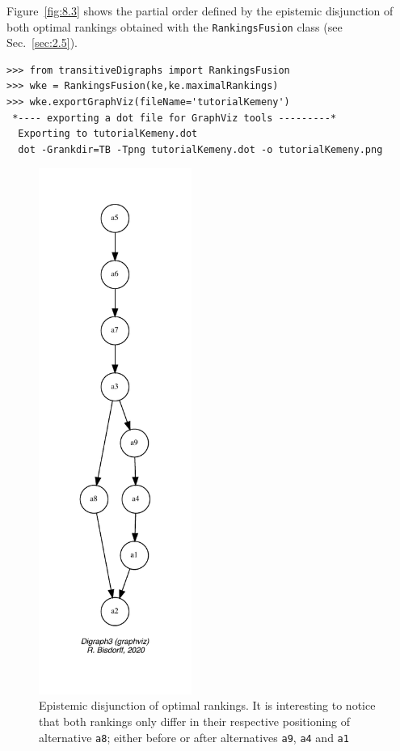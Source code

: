 Figure~\vref{fig:8.3} shows the partial order defined by the epistemic disjunction of both optimal \Kemeny rankings obtained with the \texttt{RankingsFu\-sion} class (see Sec.~\ref{sec:2.5}).
\begin{lstlisting}[caption={Computing the epistemic disjunction of all optimal \Kemeny rankings},label=list:8.10]   
>>> from transitiveDigraphs import RankingsFusion
>>> wke = RankingsFusion(ke,ke.maximalRankings)
>>> wke.exportGraphViz(fileName='tutorialKemeny')
 *---- exporting a dot file for GraphViz tools ---------*
  Exporting to tutorialKemeny.dot
  dot -Grankdir=TB -Tpng tutorialKemeny.dot -o tutorialKemeny.png
\end{lstlisting}
\begin{figure}[ht]
\sidecaption[t]
\includegraphics[width=5cm]{Figures/8-3-tutorialKemeny.pdf}
\caption{Epistemic disjunction of optimal \Kemeny rankings. It is interesting to notice that both \Kemeny rankings only differ in their respective positioning of alternative \texttt{a8}; either before or after alternatives \texttt{a9}, \texttt{a4} and \texttt{a1}}
\label{fig:8.3}       %
\end{figure}

